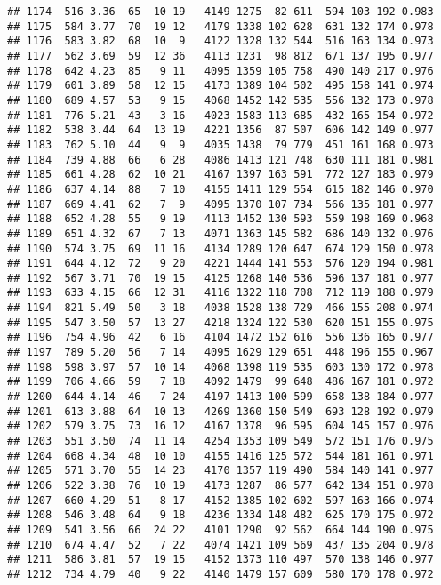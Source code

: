 \documentclass[]{article}
\begin{document}
\begin{verbatim}
## 1174  516 3.36  65  10 19   4149 1275  82 611  594 103 192 0.983
## 1175  584 3.77  70  19 12   4179 1338 102 628  631 132 174 0.978
## 1176  583 3.82  68  10  9   4122 1328 132 544  516 163 134 0.973
## 1177  562 3.69  59  12 36   4113 1231  98 812  671 137 195 0.977
## 1178  642 4.23  85   9 11   4095 1359 105 758  490 140 217 0.976
## 1179  601 3.89  58  12 15   4173 1389 104 502  495 158 141 0.974
## 1180  689 4.57  53   9 15   4068 1452 142 535  556 132 173 0.978
## 1181  776 5.21  43   3 16   4023 1583 113 685  432 165 154 0.972
## 1182  538 3.44  64  13 19   4221 1356  87 507  606 142 149 0.977
## 1183  762 5.10  44   9  9   4035 1438  79 779  451 161 168 0.973
## 1184  739 4.88  66   6 28   4086 1413 121 748  630 111 181 0.981
## 1185  661 4.28  62  10 21   4167 1397 163 591  772 127 183 0.979
## 1186  637 4.14  88   7 10   4155 1411 129 554  615 182 146 0.970
## 1187  669 4.41  62   7  9   4095 1370 107 734  566 135 181 0.977
## 1188  652 4.28  55   9 19   4113 1452 130 593  559 198 169 0.968
## 1189  651 4.32  67   7 13   4071 1363 145 582  686 140 132 0.976
## 1190  574 3.75  69  11 16   4134 1289 120 647  674 129 150 0.978
## 1191  644 4.12  72   9 20   4221 1444 141 553  576 120 194 0.981
## 1192  567 3.71  70  19 15   4125 1268 140 536  596 137 181 0.977
## 1193  633 4.15  66  12 31   4116 1322 118 708  712 119 188 0.979
## 1194  821 5.49  50   3 18   4038 1528 138 729  466 155 208 0.974
## 1195  547 3.50  57  13 27   4218 1324 122 530  620 151 155 0.975
## 1196  754 4.96  42   6 16   4104 1472 152 616  556 136 165 0.977
## 1197  789 5.20  56   7 14   4095 1629 129 651  448 196 155 0.967
## 1198  598 3.97  57  10 14   4068 1398 119 535  603 130 172 0.978
## 1199  706 4.66  59   7 18   4092 1479  99 648  486 167 181 0.972
## 1200  644 4.14  46   7 24   4197 1413 100 599  658 138 184 0.977
## 1201  613 3.88  64  10 13   4269 1360 150 549  693 128 192 0.979
## 1202  579 3.75  73  16 12   4167 1378  96 595  604 145 157 0.976
## 1203  551 3.50  74  11 14   4254 1353 109 549  572 151 176 0.975
## 1204  668 4.34  48  10 10   4155 1416 125 572  544 181 161 0.971
## 1205  571 3.70  55  14 23   4170 1357 119 490  584 140 141 0.977
## 1206  522 3.38  76  10 19   4173 1287  86 577  642 134 151 0.978
## 1207  660 4.29  51   8 17   4152 1385 102 602  597 163 166 0.974
## 1208  546 3.48  64   9 18   4236 1334 148 482  625 170 175 0.972
## 1209  541 3.56  66  24 22   4101 1290  92 562  664 144 190 0.975
## 1210  674 4.47  52   7 22   4074 1421 109 569  437 135 204 0.978
## 1211  586 3.81  57  19 15   4152 1373 110 497  570 138 146 0.977
## 1212  734 4.79  40   9 22   4140 1479 157 609  580 170 178 0.972

\end{verbatim}
\end{document}
